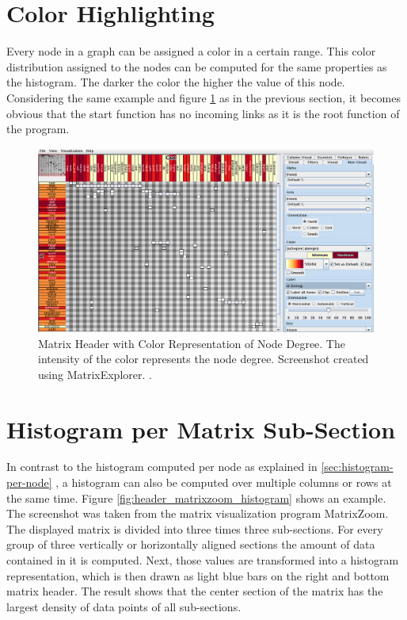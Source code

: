 \section{Color Highlighting}
Every node in a graph can be assigned a color in a certain range. This color distribution assigned to the nodes can be computed for the same properties as the histogram. The darker the color the higher the value of this node. Considering the same example and figure \ref{fig:header_matrixexplorer_color} as in the previous section, it becomes obvious that the start function has no incoming links as it is the root function of the program.
\begin{figure}[H]
  \includegraphics[width=\textwidth]{images/Header_MatrixExplorer_color.png}
  \caption{Matrix Header with Color Representation of Node Degree. The intensity of the color represents the node degree. Screenshot created using MatrixExplorer. \citep{henry-phd-2008}. \label{fig:header_matrixexplorer_color}}
\end{figure}

\section{Histogram per Matrix Sub-Section}
In contrast to the histogram computed per node as explained in \ref{sec:histogram-per-node} , a histogram can also be computed over multiple columns or rows at the same time. Figure \ref{fig:header_matrixzoom_histogram} shows an example. The screenshot was taken from the matrix visualization program MatrixZoom. The displayed matrix is divided into three times three sub-sections. For every group of three vertically or horizontally aligned sections the amount of data contained in it is computed. Next, those values are transformed into a histogram representation, which is then drawn as light blue bars on the right and bottom matrix header. The result shows that the center section of the matrix has the largest density of data points of all sub-sections.

